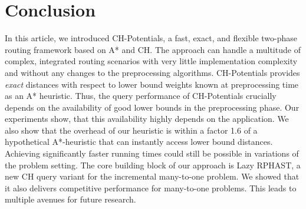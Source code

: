 \documentclass[manuscript,review]{acmart}
\begin{document}


\section{Conclusion}
\label{sec:conclusion}

In this article, we introduced CH-Potentials, a fast, exact, and flexible two-phase routing framework based on A* and CH.
The approach can handle a multitude of complex, integrated routing scenarios with very little implementation complexity and without any changes to the preprocessing algorithms.
CH-Potentials provides \emph{exact} distances with respect to lower bound weights known at preprocessing time as an A* heuristic.
Thus, the query performance of CH-Potentials crucially depends on the availability of good lower bounds in the preprocessing phase.
Our experiments show, that this availability highly depends on the application.
We also show that the overhead of our heuristic is within a factor 1.6 of a hypothetical A*-heuristic that can instantly access lower bound distances.
Achieving significantly faster running times could still be possible in variations of the problem setting.
The core building block of our approach is Lazy RPHAST, a new CH query variant for the incremental many-to-one problem.
We showed that it also delivers competitive performance for many-to-one problems.
This leads to multiple avenues for future research.
\end{document}
